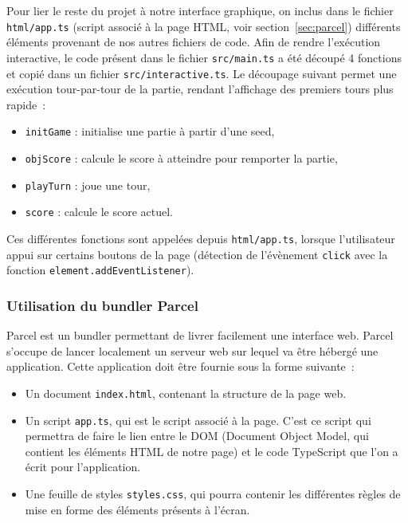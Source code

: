 Pour lier le reste du projet à notre interface graphique, on inclus dans le fichier \texttt{html/app.ts} (script associé à la page HTML, voir section~\ref{sec:parcel}) différents éléments provenant de nos autres fichiers de code. Afin de rendre l'exécution interactive, le code présent dans le fichier \texttt{src/main.ts} a été découpé 4 fonctions et copié dans un fichier \texttt{src/interactive.ts}. Le découpage suivant permet une exécution tour-par-tour de la partie, rendant l'affichage des premiers tours plus rapide~:

\begin{itemize}
    \item \texttt{initGame} : initialise une partie à partir d'une seed,
    \item \texttt{objScore} : calcule le score à atteindre pour remporter la partie,
    \item \texttt{playTurn} : joue une tour,
    \item \texttt{score} : calcule le score actuel.
\end{itemize}

Ces différentes fonctions sont appelées depuis \texttt{html/app.ts}, lorsque l'utilisateur appui sur certains boutons de la page (détection de l'évènement \texttt{click} avec la fonction \texttt{element.addEventListener}).

\subsubsection{Utilisation du bundler Parcel}

Parcel est un bundler permettant de livrer facilement une interface web. Parcel s'occupe de lancer localement un serveur web sur lequel va être hébergé une application. Cette application doit être fournie sous la forme suivante~:

\begin{itemize}
    \item Un document \texttt{index.html}, contenant la structure de la page web.
    \item Un script \texttt{app.ts}, qui est le script associé à la page. C'est ce script qui permettra de faire le lien entre le DOM (Document Object Model, qui contient les éléments HTML de notre page) et le code TypeScript que l'on a écrit pour l'application.
    \item Une feuille de styles \texttt{styles.css}, qui pourra contenir les différentes règles de mise en forme des éléments présents à l'écran.
\end{itemize}


\label{sec:parcel}